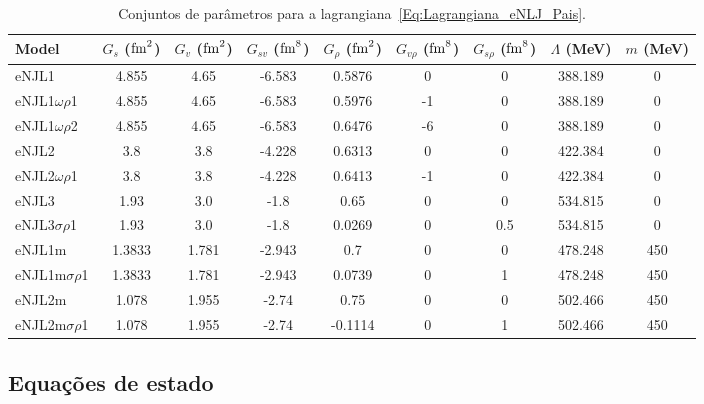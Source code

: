 \begin{table*}
\begin{tabular}{lcccccccc}
\toprule
Model & $G_s$ ($\rm{fm}^2$) & $G_v$ ($\rm{fm}^2$) & $G_{sv}$ ($\rm{fm}^8$) & $G_\rho$ ($\rm{fm}^2$) & $G_{v\rho}$ ($\rm{fm}^8$) & $G_{s\rho}$ ($\rm{fm}^8$) & $\Lambda$ (MeV) & $m$ (MeV) \\
\midrule
eNJL1 & 4.855 & 4.65 & -6.583 & 0.5876 & 0 & 0 & 388.189 & 0 \\
eNJL1$\omega\rho$1 & 4.855 & 4.65 & -6.583 & 0.5976 & -1 & 0 & 388.189 & 0 \\
eNJL1$\omega\rho$2 & 4.855 & 4.65 & -6.583 & 0.6476 & -6 & 0 & 388.189 & 0 \\
eNJL2 & 3.8 & 3.8 & -4.228 & 0.6313 & 0 & 0 & 422.384 & 0 \\
eNJL2$\omega\rho$1 & 3.8 & 3.8 & -4.228 & 0.6413 & -1 & 0 & 422.384 & 0 \\
eNJL3 & 1.93 & 3.0 & -1.8 & 0.65 & 0 & 0 & 534.815 & 0 \\
eNJL3$\sigma\rho$1 & 1.93 & 3.0 & -1.8 & 0.0269 & 0 & 0.5 & 534.815 & 0 \\
eNJL1m & 1.3833 & 1.781 & -2.943 & 0.7 & 0 & 0 & 478.248 & 450 \\
eNJL1m$\sigma\rho$1 & 1.3833 & 1.781 & -2.943 & 0.0739 & 0 & 1 & 478.248 & 450 \\
eNJL2m & 1.078 & 1.955 & -2.74 & 0.75 & 0 & 0 & 502.466 & 450 \\
eNJL2m$\sigma\rho$1 & 1.078 & 1.955 & -2.74 & -0.1114 & 0 & 1 & 502.466 & 450 \\
\bottomrule
\end{tabular}
\caption{Conjuntos de parâmetros para a lagrangiana~\eqref{Eq:Lagrangiana_eNLJ_Pais}. \label{Tab:Parametros_eNJL}}
\end{table*}

\subsection{Equações de estado} 


